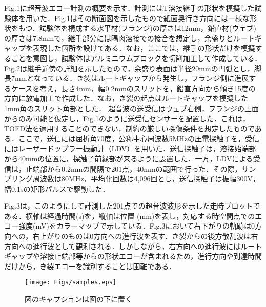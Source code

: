 Fig.1に超音波エコー計測の概要を示す．計測にはT溶接継手の形状を模擬した試験体を用いた．Fig.1はその断面図を示したもので紙面奥行き方向には一様な形状をもつ．試験体を構成する水平材(フランジ)の厚さは12mm，鉛直材(ウェブ)の厚さは7.8mmで，継手部分には隅肉溶接での接合を想定し，余盛りとルートギャップを表現した箇所を設けてある．なお，ここでは，継手の形状だけを模擬することを意図し，試験体はアルミニウムブロックを切削加工して作成している．Fig.2は継手近傍の詳細を示したもので，余盛り表面は半径20mmの円弧とし，脚長7mmとなっている．き裂はルートギャップから発生し，フランジ側に進展するケースを考え，長さ4mm，幅0.2mmのスリットを，鉛直方向から傾き15度の方向に放電加工で作成した．なお，き裂の起点はルートギャップを模擬した1mm角のスリット角部とした． 超音波の送受信はウェブ右側，フランジの上面からのみ可能と仮定し，Fig.1のように送受信センサーを配置した．これは，TOFD法を適用することのできない，制約の厳しい探傷条件を想定したものである．ここで，送信には屈折角70度，公称中心周波数5MHzの圧電探触子を，受信にはレーザードップラー振動計（LDV）を用いた．送信探触子は，溶接始端部から40mmの位置に，探触子前縁部が来るように設置した．一方，LDVによる受信は，止端部から0.2mmの間隔で201点，40mmの範囲で行った．その際，サンプリング周波数は80MHz，平均化回数は4,096回とし，送信探触子は振幅300V，幅0.1sの矩形パルスで駆動した．

Fig.3は，このようにして計測した201点での超音波波形を示した走時プロットである．横軸は経過時間(s)を，縦軸は位置 (mm)を表し，対応する時空間点でのエコー強度(mV)をカラーマップで示している．Fig.3において右下がりの軌跡は0方向への，右上がりのものは0方向への進行波を表す．き裂からの後方散乱波は右方向への進行波として観測される．しかしながら，右方向への進行波にはルートギャップや溶接止端部等からの形状エコーが含まれるため，進行方向や到達時間だけから，き裂エコーを識別することは困難である． 
\begin{figure}[htb]
\centering
	\texttt{[image: Figs/samples.eps]}
\caption{図のキャプションは図の下に置く}
\label{fig:sample}
\end{figure}

